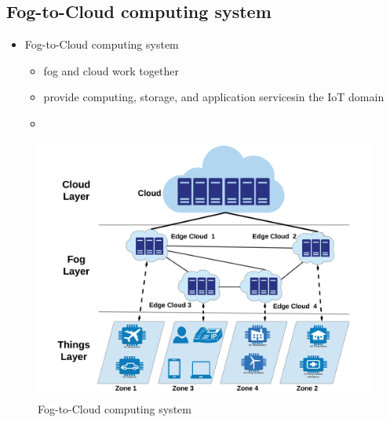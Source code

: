 \documentclass{beamer}
\begin{document}
\subsection[Fog-to-Cloud]{Fog-to-Cloud computing system}
\begin{frame}
	\begin{itemize}
	\item Fog-to-Cloud computing system
	\begin{itemize}
		\item {fog and cloud work together}
		\item {provide computing, storage, and application servicesin the IoT domain}
		\item \color{red}{complex management of such a
			network of distributed fogs}
			
	\end{itemize}
\end{itemize}
\begin{figure}
	\centering
	\includegraphics[scale=0.13]{"Fog-to-cloud computing system"}
	\caption{Fog-to-Cloud computing system}
	\label{fig:fog-to-cloud-computing-system}
\end{figure}
\end{frame}
\end{document}
